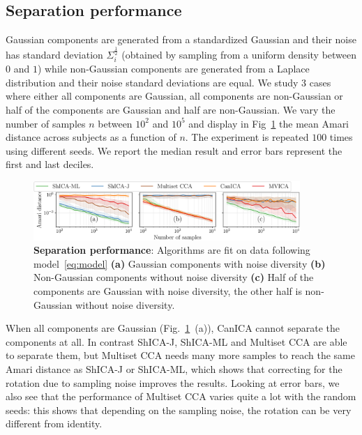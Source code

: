 \subsection{Separation performance}
\label{sec:rotation}
Gaussian components are generated from a standardized Gaussian and their noise has standard deviation $\Sigma_i^{\frac12}$ (obtained by sampling from a uniform density between $0$ and $1$) while non-Gaussian components are generated from a Laplace distribution and their noise standard deviations are equal. We study 3 cases where either all components are Gaussian, all components are non-Gaussian or half of the components are Gaussian and half are non-Gaussian. We vary the number of samples $n$ between $10^2$ and $10^5$ and display in Fig~\ref{exp:rotation} the mean Amari distance across subjects as a function of $n$. The experiment is repeated $100$ times using different seeds. We report the median result and error bars  represent the first and last deciles.
\begin{figure}
\centering
  \includegraphics[width=0.9\textwidth]{./figures/amvica/identifiability.pdf}
  \vspace{-1em}
  \caption{\textbf{Separation performance}: Algorithms are fit on data following model~\ref{eq:model} \textbf{(a)} Gaussian components with noise diversity \textbf{(b)} Non-Gaussian components without noise diversity \textbf{(c)} Half of the components are Gaussian with noise diversity, the other half is non-Gaussian without noise diversity. 
  }
  \label{exp:rotation}
  \vspace{-1.5em}
\end{figure}
When all components are Gaussian (Fig.~\ref{exp:rotation}~(a)), CanICA cannot separate the components at all. In contrast ShICA-J, ShICA-ML and Multiset CCA are able to separate them, but Multiset CCA needs many more samples to reach the same Amari distance as ShICA-J or ShICA-ML, which shows that correcting for the rotation due to sampling noise improves the results. Looking at error bars, we also see that the performance of Multiset CCA varies quite a lot with the random seeds: this shows that depending on the sampling noise, the rotation can be very different from identity.
